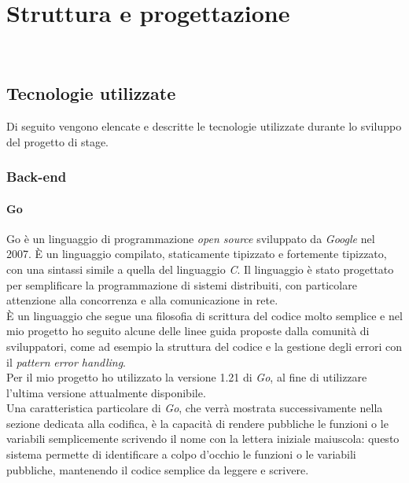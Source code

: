 \chapter{Struttura e progettazione}
\label{cap:struttura-progettazione}

\\

\section{Tecnologie utilizzate}

Di seguito vengono elencate e descritte le tecnologie utilizzate durante lo sviluppo del
progetto di stage.

\subsection{Back-end}

\subsubsection{Go}

Go è un linguaggio di programmazione \emph{open source} sviluppato da
\emph{Google} nel 2007. È un linguaggio compilato, staticamente tipizzato e
fortemente tipizzato, con una sintassi simile a quella del linguaggio \emph{C}.
Il linguaggio è stato progettato per semplificare la programmazione di sistemi
distribuiti, con particolare attenzione alla concorrenza e alla
comunicazione in rete. \\
È un linguaggio che segue una filosofia di scrittura del codice molto semplice e
nel mio progetto ho seguito alcune delle linee guida proposte dalla comunità di
sviluppatori, come ad esempio la struttura del codice e la gestione degli errori
con il \emph{pattern} \emph{error handling}. \\
Per il mio progetto ho utilizzato la versione 1.21 di \emph{Go}, al fine di
utilizzare l'ultima versione attualmente disponibile.\\
Una caratteristica particolare di \emph{Go}, che verrà mostrata successivamente
nella sezione dedicata alla codifica, è la capacità di rendere pubbliche le
funzioni o le variabili semplicemente scrivendo il nome con la lettera iniziale
maiuscola: questo sistema permette di identificare a colpo d'occhio le funzioni
o le variabili pubbliche, mantenendo il codice semplice da leggere e scrivere. \cite{go}

